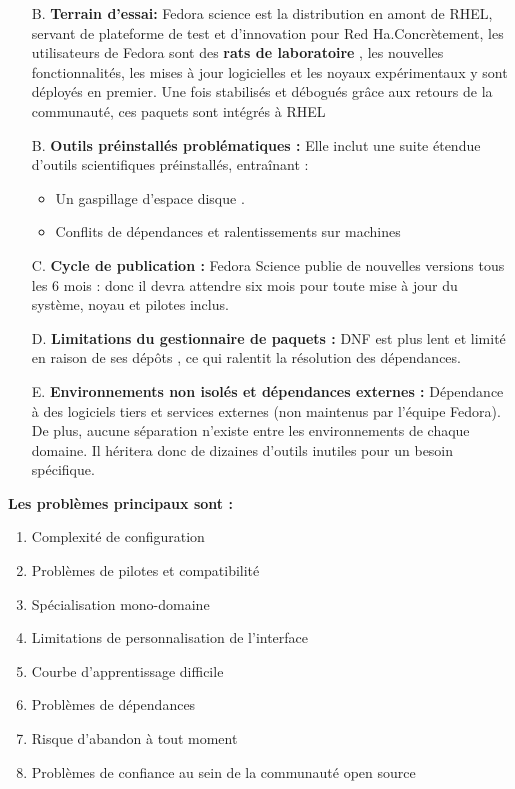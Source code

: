 \begin{itemize}[leftmargin=*,nosep]
\begin{itemize}
    \item[B.] \textbf{Terrain d’essai:} Fedora science est la distribution en amont de RHEL, servant de plateforme de test et d’innovation pour Red Ha.Concrètement, les utilisateurs de Fedora sont des \textbf{rats de laboratoire}  , les nouvelles fonctionnalités, les mises à jour logicielles et les noyaux expérimentaux y sont déployés en premier. Une fois stabilisés et débogués grâce aux retours de la communauté, ces paquets sont intégrés à RHEL
    
    \item[B.] \textbf{ Outils préinstallés problématiques :} Elle inclut une suite étendue d’outils scientifiques préinstallés, entraînant :
        \begin{itemize}
            \item Un gaspillage d’espace disque .
            \item Conflits de dépendances et ralentissements sur machines 
        \end{itemize}
    
  \item[C.] \textbf{Cycle de publication :} Fedora Science publie de nouvelles versions tous les 6 mois : donc il devra attendre six mois pour toute mise à jour du système, noyau et pilotes inclus.

    \item[D.] \textbf{Limitations du gestionnaire de paquets :}  DNF est plus lent et limité en raison de ses dépôts , ce qui ralentit la résolution des dépendances.
    
  \item[E.]  \textbf{Environnements non isolés et dépendances externes :} Dépendance à des logiciels tiers et services externes (non maintenus par l’équipe Fedora). De plus, aucune séparation n’existe entre les environnements de chaque domaine. Il héritera donc de dizaines d’outils inutiles pour un besoin spécifique.
\end{itemize}


\textbf{Les problèmes principaux sont :}
\begin{enumerate}[label=\alph*)]
    \item Complexité de configuration
    \item Problèmes de pilotes et compatibilité
    \item Spécialisation mono-domaine
    \item Limitations de personnalisation de l’interface
    \item Courbe d’apprentissage difficile
    \item Problèmes de dépendances
    \item Risque d’abandon à tout moment
    \item Problèmes de confiance au sein de la communauté open source
\end{enumerate}
\clearpage

\end{itemize}
